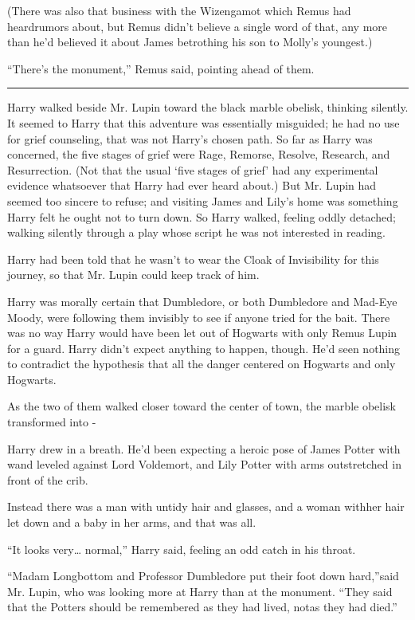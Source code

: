 (There was also that business with the Wizengamot which Remus had heardrumors about, but Remus didn't believe a single word of that, any more than he'd believed it about James betrothing his son to Molly's youngest.)

``There's the monument,'' Remus said, pointing ahead of them.

\begin{center}\rule{3in}{0.4pt}\end{center}

Harry walked beside Mr. Lupin toward the black marble obelisk, thinking silently. It seemed to Harry that this adventure was essentially misguided; he had no use for grief counseling, that was not Harry's chosen path. So far as Harry was concerned, the five stages of grief were Rage, Remorse, Resolve, Research, and Resurrection. (Not that the usual `five stages of grief' had any experimental evidence whatsoever that Harry had ever heard about.) But Mr. Lupin had seemed too sincere to refuse; and visiting James and Lily's home was something Harry felt he ought not to turn down. So Harry walked, feeling oddly detached; walking silently through a play whose script he was not interested in reading.

Harry had been told that he wasn't to wear the Cloak of Invisibility for this journey, so that Mr. Lupin could keep track of him.

Harry was morally certain that Dumbledore, or both Dumbledore and Mad-Eye Moody, were following them invisibly to see if anyone tried for the bait. There was no way Harry would have been let out of Hogwarts with only Remus Lupin for a guard. Harry didn't expect anything to happen, though. He'd seen nothing to contradict the hypothesis that all the danger centered on Hogwarts and only Hogwarts.

As the two of them walked closer toward the center of town, the marble obelisk transformed into -

Harry drew in a breath. He'd been expecting a heroic pose of James Potter with wand leveled against Lord Voldemort, and Lily Potter with arms outstretched in front of the crib.

Instead there was a man with untidy hair and glasses, and a woman withher hair let down and a baby in her arms, and that was all.

``It looks very\ldots{} normal,'' Harry said, feeling an odd catch in his throat.

``Madam Longbottom and Professor Dumbledore put their foot down hard,''said Mr. Lupin, who was looking more at Harry than at the monument. ``They said that the Potters should be remembered as they had lived, notas they had died.''

